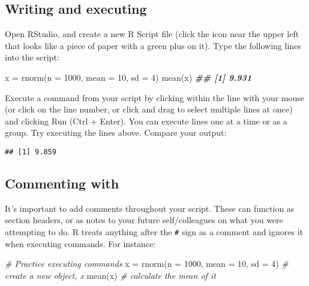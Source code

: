 \documentclass[
  12pt,
]{krantz}
\newenvironment{Shaded}{\begin{snugshade}}{\end{snugshade}}
\newcommand{\AttributeTok}[1]{\textcolor[rgb]{0.77,0.63,0.00}{#1}}
\newcommand{\CommentTok}[1]{\textcolor[rgb]{0.56,0.35,0.01}{\textit{#1}}}
\newcommand{\DecValTok}[1]{\textcolor[rgb]{0.00,0.00,0.81}{#1}}
\newcommand{\DocumentationTok}[1]{\textcolor[rgb]{0.56,0.35,0.01}{\textbf{\textit{#1}}}}
\newcommand{\FunctionTok}[1]{\textcolor[rgb]{0.00,0.00,0.00}{#1}}
\newcommand{\NormalTok}[1]{#1}
\newcommand{\OtherTok}[1]{\textcolor[rgb]{0.56,0.35,0.01}{#1}}
\begin{document}
\hypertarget{writing-and-executing}{%
\subsection{Writing and executing}\label{writing-and-executing}}

Open RStudio, and create a new R Script file (click the icon near the upper left that looks like a piece of paper with a green plus on it). Type the following lines into the script:

\begin{Shaded}
\begin{Highlighting}[]
\NormalTok{  x }\OtherTok{=} \FunctionTok{rnorm}\NormalTok{(}\AttributeTok{n =} \DecValTok{1000}\NormalTok{, }\AttributeTok{mean =} \DecValTok{10}\NormalTok{, }\AttributeTok{sd =} \DecValTok{4}\NormalTok{)}
  \FunctionTok{mean}\NormalTok{(x)}
\DocumentationTok{\#\# [1] 9.931}
\end{Highlighting}
\end{Shaded}

Execute a command from your script by clicking within the line with your mouse (or click on the line number, or click and drag to select multiple lines at once) and clicking Run (Ctrl + Enter). You can execute lines one at a time or as a group. Try executing the lines above. Compare your output:

\begin{verbatim}
## [1] 9.859
\end{verbatim}

\hypertarget{commenting-with}{%
\subsection{Commenting with}\label{commenting-with}}

It's important to add comments throughout your script. These can function as section headers, or as notes to your future self/colleagues on what you were attempting to do. R treats anything after the \texttt{\#} sign as a comment and ignores it when executing commands. For instance:

\begin{Shaded}
\begin{Highlighting}[]
\CommentTok{\# Practice executing commands    }
\NormalTok{  x }\OtherTok{=} \FunctionTok{rnorm}\NormalTok{(}\AttributeTok{n =} \DecValTok{1000}\NormalTok{, }\AttributeTok{mean =} \DecValTok{10}\NormalTok{, }\AttributeTok{sd =} \DecValTok{4}\NormalTok{)  }\CommentTok{\# create a new object, x}
  \FunctionTok{mean}\NormalTok{(x)                                 }\CommentTok{\# calculate the mean of it}
\end{Highlighting}
\end{Shaded}
\end{document}
